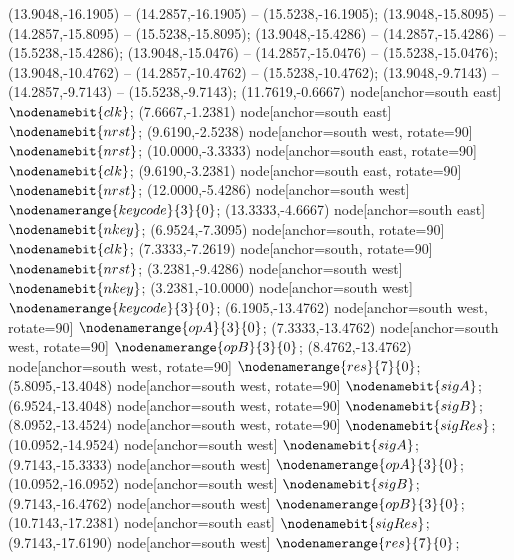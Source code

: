    (13.9048,-16.1905) -- (14.2857,-16.1905) -- (15.5238,-16.1905);
   (13.9048,-15.8095) -- (14.2857,-15.8095) -- (15.5238,-15.8095);
   (13.9048,-15.4286) -- (14.2857,-15.4286) -- (15.5238,-15.4286);
   (13.9048,-15.0476) -- (14.2857,-15.0476) -- (15.5238,-15.0476);
   (13.9048,-10.4762) -- (14.2857,-10.4762) -- (15.5238,-10.4762);
   (13.9048,-9.7143) -- (14.2857,-9.7143) -- (15.5238,-9.7143);
   (11.7619,-0.6667) node[anchor=south east] {$\nodenamebit{clk}$};
   (7.6667,-1.2381) node[anchor=south east] {$\nodenamebit{nrst}$};
   (9.6190,-2.5238) node[anchor=south west, rotate=90] {$\nodenamebit{nrst}$};
   (10.0000,-3.3333) node[anchor=south east, rotate=90] {$\nodenamebit{clk}$};
   (9.6190,-3.2381) node[anchor=south east, rotate=90] {$\nodenamebit{nrst}$};
   (12.0000,-5.4286) node[anchor=south west] {$\nodenamerange{keycode}{3}{0}$};
   (13.3333,-4.6667) node[anchor=south east] {$\nodenamebit{nkey}$};
   (6.9524,-7.3095) node[anchor=south, rotate=90] {$\nodenamebit{clk}$};
   (7.3333,-7.2619) node[anchor=south, rotate=90] {$\nodenamebit{nrst}$};
   (3.2381,-9.4286) node[anchor=south west] {$\nodenamebit{nkey}$};
   (3.2381,-10.0000) node[anchor=south west] {$\nodenamerange{keycode}{3}{0}$};
   (6.1905,-13.4762) node[anchor=south west, rotate=90] {$\nodenamerange{opA}{3}{0}$};
   (7.3333,-13.4762) node[anchor=south west, rotate=90] {$\nodenamerange{opB}{3}{0}$};
   (8.4762,-13.4762) node[anchor=south west, rotate=90] {$\nodenamerange{res}{7}{0}$};
   (5.8095,-13.4048) node[anchor=south west, rotate=90] {$\nodenamebit{sigA}$};
   (6.9524,-13.4048) node[anchor=south west, rotate=90] {$\nodenamebit{sigB}$};
   (8.0952,-13.4524) node[anchor=south west, rotate=90] {$\nodenamebit{sigRes}$};
   (10.0952,-14.9524) node[anchor=south west] {$\nodenamebit{sigA}$};
   (9.7143,-15.3333) node[anchor=south west] {$\nodenamerange{opA}{3}{0}$};
   (10.0952,-16.0952) node[anchor=south west] {$\nodenamebit{sigB}$};
   (9.7143,-16.4762) node[anchor=south west] {$\nodenamerange{opB}{3}{0}$};
   (10.7143,-17.2381) node[anchor=south east] {$\nodenamebit{sigRes}$};
   (9.7143,-17.6190) node[anchor=south west] {$\nodenamerange{res}{7}{0}$};
